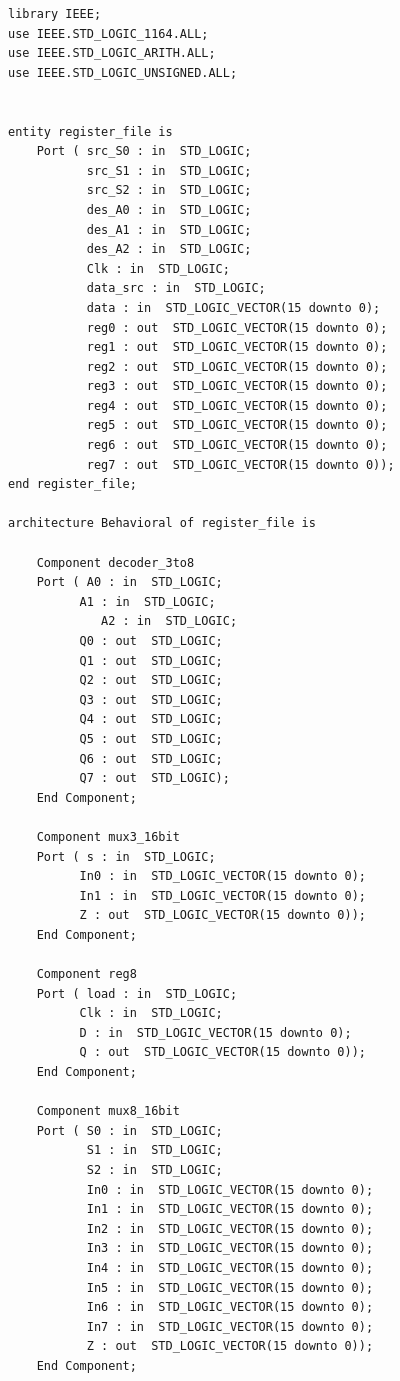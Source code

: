 \documentclass{article}
\begin{document}
\begin{lstlisting}
library IEEE;
use IEEE.STD_LOGIC_1164.ALL;
use IEEE.STD_LOGIC_ARITH.ALL;
use IEEE.STD_LOGIC_UNSIGNED.ALL;


entity register_file is
    Port ( src_S0 : in  STD_LOGIC;
           src_S1 : in  STD_LOGIC;
           src_S2 : in  STD_LOGIC;
           des_A0 : in  STD_LOGIC;
           des_A1 : in  STD_LOGIC;
           des_A2 : in  STD_LOGIC;
           Clk : in  STD_LOGIC;
           data_src : in  STD_LOGIC;
           data : in  STD_LOGIC_VECTOR(15 downto 0);
           reg0 : out  STD_LOGIC_VECTOR(15 downto 0);
           reg1 : out  STD_LOGIC_VECTOR(15 downto 0);
           reg2 : out  STD_LOGIC_VECTOR(15 downto 0);
           reg3 : out  STD_LOGIC_VECTOR(15 downto 0);
           reg4 : out  STD_LOGIC_VECTOR(15 downto 0);
           reg5 : out  STD_LOGIC_VECTOR(15 downto 0);
           reg6 : out  STD_LOGIC_VECTOR(15 downto 0);
           reg7 : out  STD_LOGIC_VECTOR(15 downto 0));
end register_file;

architecture Behavioral of register_file is

	Component decoder_3to8
	Port ( A0 : in  STD_LOGIC;
          A1 : in  STD_LOGIC;
			 A2 : in  STD_LOGIC;
          Q0 : out  STD_LOGIC;
          Q1 : out  STD_LOGIC;
          Q2 : out  STD_LOGIC;
          Q3 : out  STD_LOGIC;
          Q4 : out  STD_LOGIC;
          Q5 : out  STD_LOGIC;
          Q6 : out  STD_LOGIC;
          Q7 : out  STD_LOGIC);
	End Component;

	Component mux3_16bit
	Port ( s : in  STD_LOGIC;
          In0 : in  STD_LOGIC_VECTOR(15 downto 0);
          In1 : in  STD_LOGIC_VECTOR(15 downto 0);
          Z : out  STD_LOGIC_VECTOR(15 downto 0));
	End Component;
	
	Component reg8
	Port ( load : in  STD_LOGIC;
          Clk : in  STD_LOGIC;
          D : in  STD_LOGIC_VECTOR(15 downto 0);
          Q : out  STD_LOGIC_VECTOR(15 downto 0));
	End Component;
	
	Component mux8_16bit
	Port ( S0 : in  STD_LOGIC;
           S1 : in  STD_LOGIC;
           S2 : in  STD_LOGIC;
           In0 : in  STD_LOGIC_VECTOR(15 downto 0);
           In1 : in  STD_LOGIC_VECTOR(15 downto 0);
           In2 : in  STD_LOGIC_VECTOR(15 downto 0);
           In3 : in  STD_LOGIC_VECTOR(15 downto 0);
           In4 : in  STD_LOGIC_VECTOR(15 downto 0);
           In5 : in  STD_LOGIC_VECTOR(15 downto 0);
           In6 : in  STD_LOGIC_VECTOR(15 downto 0);
           In7 : in  STD_LOGIC_VECTOR(15 downto 0);
           Z : out  STD_LOGIC_VECTOR(15 downto 0));
	End Component;
	

\end{lstlisting}
\end{document}
